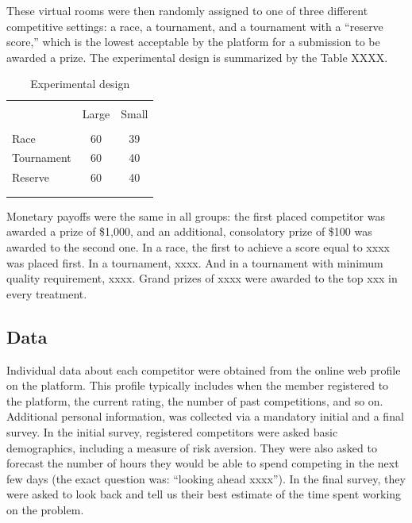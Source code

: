 \documentclass[12pt,]{article}
\begin{document}
These virtual rooms were then randomly assigned to one of three
different competitive settings: a race, a tournament, and a tournament
with a ``reserve score,'' which is the lowest acceptable by the platform
for a submission to be awarded a prize. The experimental design is
summarized by the Table XXXX.

\begin{table}
\centering
\caption{Experimental design}
\label{tab: experimental design}
\begin{tabular}{@{}lcc}
  \\[-1.8ex]\hline \hline \\[-1.8ex]
 & Large & Small \\ 
  \hline \\[-1.86ex]
Race & 60 & 39 \\ 
  Tournament & 60 & 40 \\ 
  Reserve & 60 & 40 \\ 
   \\[-1.8ex]\hline \hline \\[-1.8ex]
\end{tabular}
\end{table}

Monetary payoffs were the same in all groups: the first placed
competitor was awarded a prize of \$1,000, and an additional,
consolatory prize of \$100 was awarded to the second one. In a race, the
first to achieve a score equal to xxxx was placed first. In a
tournament, xxxx. And in a tournament with minimum quality requirement,
xxxx. Grand prizes of xxxx were awarded to the top xxx in every
treatment.

\subsection{Data}\label{data}

Individual data about each competitor were obtained from the online web
profile on the platform. This profile typically includes when the member
registered to the platform, the current rating, the number of past
competitions, and so on. Additional personal information, was collected
via a mandatory initial and a final survey. In the initial survey,
registered competitors were asked basic demographics, including a
measure of risk aversion. They were also asked to forecast the number of
hours they would be able to spend competing in the next few days (the
exact question was: ``looking ahead xxxx''). In the final survey, they
were asked to look back and tell us their best estimate of the time
spent working on the problem.
\end{document}
